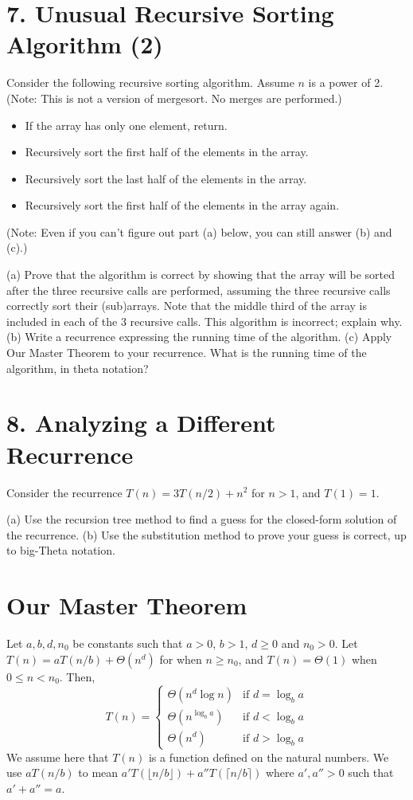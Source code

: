 \documentclass{article}
\begin{document}
\section*{7. Unusual Recursive Sorting Algorithm (2)}

Consider the following recursive sorting algorithm. Assume $n$ is a power of 2. (Note: This is not a version of mergesort. No merges are performed.)

\begin{itemize}
    \item If the array has only one element, return.
    \item Recursively sort the first half of the elements in the array.
    \item Recursively sort the last half of the elements in the array.
    \item Recursively sort the first half of the elements in the array again.
\end{itemize}
(Note: Even if you can’t figure out part (a) below, you can still answer (b) and (c).)

(a) Prove that the algorithm is correct by showing that the array will be sorted after the three recursive calls are performed, assuming the three recursive calls correctly sort their (sub)arrays. Note that the middle third of the array is included in each of the 3 recursive calls.  This algorithm is incorrect; explain why.
(b) Write a recurrence expressing the running time of the algorithm.
(c) Apply Our Master Theorem to your recurrence. What is the running time of the algorithm, in theta notation?


\section*{8.  Analyzing a Different Recurrence}

Consider the recurrence $T(n) = 3T(n/2) + n^2$ for $n > 1$, and $T(1) = 1$.

(a) Use the recursion tree method to find a guess for the closed-form solution of the recurrence.
(b) Use the substitution method to prove your guess is correct, up to big-Theta notation.


\section*{Our Master Theorem}

\begin{theorem}
Let $a, b, d, n_0$ be constants such that $a > 0$, $b > 1$, $d \geq 0$ and $n_0 > 0$.
Let $T(n) = aT(n/b) + \Theta(n^d)$ for when $n \geq n_0$, and $T(n) = \Theta(1)$ when $0 \leq n < n_0$. Then,
\[
T(n) = \begin{cases}
\Theta(n^d \log n) & \text{if } d = \log_b a \\
\Theta(n^{\log_b a}) & \text{if } d < \log_b a \\
\Theta(n^d) & \text{if } d > \log_b a
\end{cases}
\]
We assume here that $T(n)$ is a function defined on the natural numbers. We use $aT(n/b)$ to mean $a'T(\lfloor n/b \rfloor) + a''T(\lceil n/b \rceil)$ where $a', a'' > 0$ such that $a' + a'' = a$.
\end{theorem}
\end{document}
